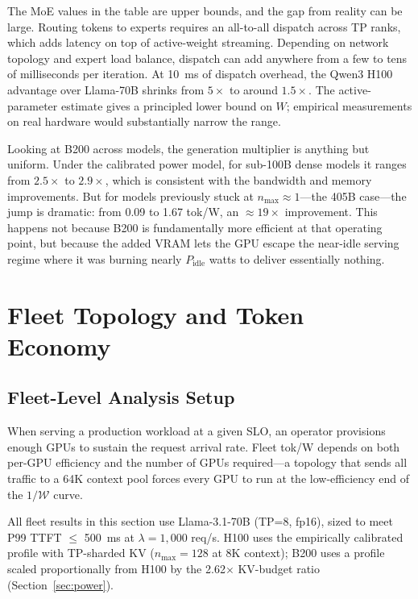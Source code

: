 \documentclass[11pt,a4paper]{article}
\newcommand{\nmax}{n_{\max}}
\newcommand{\Pidle}{P_{\text{idle}}}
\begin{document}
The MoE values in the table are upper bounds, and the gap from reality can
be large.  Routing tokens to experts requires an all-to-all dispatch across
TP ranks, which adds latency on top of active-weight streaming.  Depending on
network topology and expert load balance, dispatch can add anywhere from a few
to tens of milliseconds per iteration.  At 10~ms of dispatch overhead, the
Qwen3 H100 advantage over Llama-70B shrinks from $5\times$ to around
$1.5\times$.  The active-parameter estimate gives a principled lower bound on
$W$; empirical measurements on real hardware would substantially narrow the
range.

Looking at B200 across models, the generation multiplier is anything but
uniform.  Under the calibrated power model, for sub-100B dense models it
ranges from $2.5\times$ to $2.9\times$,
which is consistent with the bandwidth and memory improvements.  But for
models previously stuck at $\nmax \approx 1$---the 405B case---the jump is
dramatic: from 0.09 to 1.67 tok/W, an $\approx 19\times$ improvement.  This happens
not because B200 is fundamentally more efficient at that operating point, but
because the added VRAM lets the GPU escape the near-idle serving regime where
it was burning nearly $\Pidle$ watts to deliver essentially nothing.

\section{Fleet Topology and Token Economy}
\label{sec:fleet-topology}

\subsection{Fleet-Level Analysis Setup}
\label{sec:fleet-setup}

When serving a production workload at a given SLO, an operator provisions
enough GPUs to sustain the request arrival rate.  Fleet tok/W depends on
both per-GPU efficiency and the number of GPUs required---a topology that
sends all traffic to a 64K context pool forces every GPU to run at the
low-efficiency end of the $1/\mathcal{W}$ curve.

All fleet results in this section use Llama-3.1-70B (TP=8, fp16), sized to
meet P99 TTFT $\leq$ 500~ms at $\lambda = 1{,}000$ req/s.  H100 uses the
empirically calibrated profile with TP-sharded KV ($n_{\max} = 128$ at 8K
context); B200 uses a profile scaled proportionally from H100 by the
2.62$\times$ KV-budget ratio (Section~\ref{sec:power}).
\end{document}
